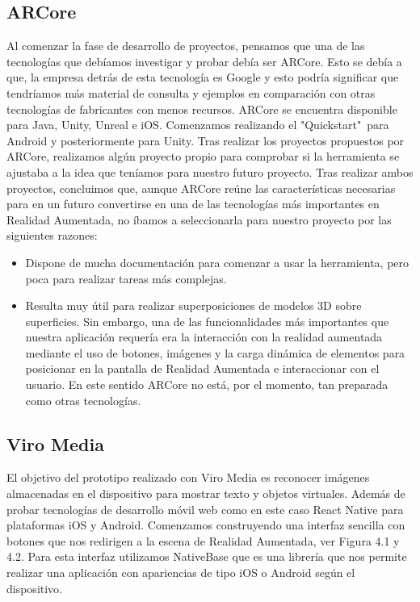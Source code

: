 \subsection{ARCore} 
\label{makereference4.1.1} 
    Al comenzar la fase de desarrollo de proyectos, pensamos que una de las tecnologías que debíamos 
    investigar y probar debía ser ARCore. Esto se debía a que, la empresa detrás de esta 
    tecnología es Google y esto podría significar que tendríamos más material de consulta 
    y ejemplos en comparación con otras tecnologías de fabricantes con menos recursos.
    ARCore se encuentra disponible para Java, Unity, Unreal e iOS. Comenzamos realizando el 
    "Quickstart"\ para Android y posteriormente para Unity. 
    Tras realizar los proyectos propuestos por ARCore, realizamos algún proyecto propio 
    para comprobar si la herramienta se ajustaba a la idea que teníamos para nuestro futuro proyecto.
    Tras realizar ambos proyectos, concluimos que, aunque ARCore reúne las características 
    necesarias para en un futuro convertirse en una de las tecnologías más importantes en Realidad Aumentada, 
    no íbamos a seleccionarla para nuestro proyecto por las siguientes razones:
    \begin{itemize}
        \item Dispone de mucha documentación para comenzar a usar la herramienta, pero poca para realizar tareas más complejas.
        \item Resulta muy útil para realizar superposiciones de modelos 3D sobre superficies. Sin embargo, una de las funcionalidades más importantes que nuestra aplicación requería era la interacción con la realidad aumentada mediante el uso de botones, imágenes y la carga dinámica de elementos para posicionar en la pantalla de Realidad Aumentada e interaccionar con el usuario. En este sentido ARCore no está, por el momento, tan preparada como otras tecnologías.
    \end{itemize}
\subsection{Viro Media} 
\label{makereference4.1.2}

El objetivo del prototipo realizado con Viro Media es reconocer imágenes almacenadas en el dispositivo para mostrar texto y
objetos virtuales. Además de probar tecnologías de desarrollo móvil web como en este caso React Native
para plataformas iOS y Android. Comenzamos construyendo una interfaz sencilla con botones que nos redirigen a la escena de Realidad Aumentada, ver Figura 4.1 y 4.2.
Para esta interfaz utilizamos NativeBase que es una librería que nos permite
realizar una aplicación con apariencias de tipo iOS o Android según el dispositivo.

